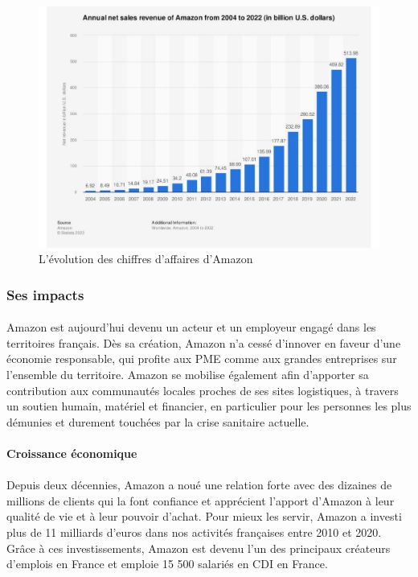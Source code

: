 \begin{figure}[htbp]
    \centering
    \includegraphics[width=0.8\linewidth]{./Graphismes-UTC/logos/Amazon/266282.pdf}\hfill
    \caption{L'évolution des chiffres d'affaires d'Amazon}
\end{figure}

\subsubsection{Ses impacts}
\paragraph{}
\vspace{-2em}  %
Amazon est aujourd'hui devenu un acteur et un employeur engagé dans les territoires français. Dès sa création, Amazon n'a cessé d'innover en faveur d'une économie responsable, qui profite aux PME comme aux grandes entreprises sur l'ensemble du territoire. Amazon se mobilise également afin d'apporter sa contribution aux communautés locales proches de ses sites logistiques, à travers un soutien humain, matériel et financier, en particulier pour les personnes les plus démunies et durement touchées par la crise sanitaire actuelle.
\paragraph{}
\vspace{-2em}  %

{\large\textbf{Croissance économique}}
\paragraph{}
\vspace{-3em}  %
Depuis deux décennies, Amazon a noué une relation forte avec des dizaines de millions de clients qui la font confiance et apprécient l'apport d'Amazon à leur qualité de vie et à leur pouvoir d'achat. Pour mieux les servir, Amazon a investi plus de 11 milliards d'euros dans nos activités françaises entre 2010 et 2020. Grâce à ces investissements, Amazon est devenu l'un des principaux créateurs d'emplois en France et emploie 15 500 salariés en CDI en France.
